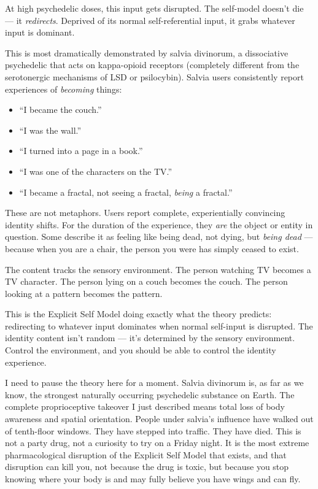 \documentclass[11pt, twoside, openright]{book}
\begin{document}
At high psychedelic doses, this input gets disrupted. The self-model doesn't die --- it \textit{redirects}. Deprived of its normal self-referential input, it grabs whatever input is dominant.

This is most dramatically demonstrated by salvia divinorum, a dissociative psychedelic that acts on kappa-opioid receptors (completely different from the serotonergic mechanisms of LSD or psilocybin). Salvia users consistently report experiences of \textit{becoming} things:

\begin{itemize}
  \item ``I became the couch.''
  \item ``I was the wall.''
  \item ``I turned into a page in a book.''
  \item ``I was one of the characters on the TV.''
  \item ``I became a fractal, not seeing a fractal, \textit{being} a fractal.''
\end{itemize}

These are not metaphors. Users report complete, experientially convincing identity shifts. For the duration of the experience, they \textit{are} the object or entity in question. Some describe it as feeling like being dead, not dying, but \textit{being dead} --- because when you are a chair, the person you were has simply ceased to exist.

The content tracks the sensory environment. The person watching TV becomes a TV character. The person lying on a couch becomes the couch. The person looking at a pattern becomes the pattern.

This is the Explicit Self Model doing exactly what the theory predicts: redirecting to whatever input dominates when normal self-input is disrupted. The identity content isn't random --- it's determined by the sensory environment. Control the environment, and you should be able to control the identity experience.

I need to pause the theory here for a moment. Salvia divinorum is, as far as we know, the strongest naturally occurring psychedelic substance on Earth. The complete proprioceptive takeover I just described means total loss of body awareness and spatial orientation. People under salvia's influence have walked out of tenth-floor windows. They have stepped into traffic. They have died. This is not a party drug, not a curiosity to try on a Friday night. It is the most extreme pharmacological disruption of the Explicit Self Model that exists, and that disruption can kill you, not because the drug is toxic, but because you stop knowing where your body is and may fully believe you have wings and can fly.
\end{document}

